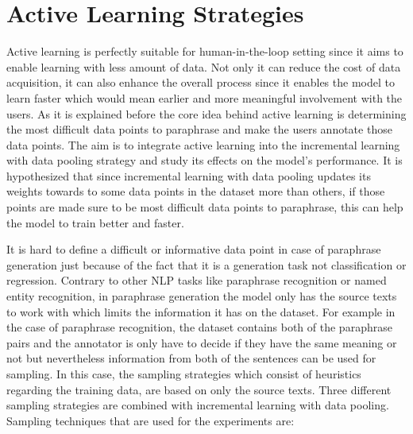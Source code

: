 \section{Active Learning Strategies}

Active learning is perfectly suitable for human-in-the-loop setting since it aims to enable learning with less amount of data. Not only it can reduce the cost of data acquisition, it can also enhance the overall process since it enables the model to learn faster which would mean earlier and more meaningful involvement with the users. As it is explained before the core idea behind active learning is determining the most difficult data points to paraphrase and make the users annotate those data points. The aim is to integrate active learning into the incremental learning with data pooling strategy and study its effects on the model's performance. It is hypothesized that since incremental learning with data pooling updates its weights towards to some data points in the dataset more than others, if those points are made sure to be most difficult data points to paraphrase, this can help the model to train better and faster.

It is hard to define a difficult or informative data point in case of paraphrase generation just because of the fact that it is a generation task not classification or regression. Contrary to other NLP tasks like paraphrase recognition or named entity recognition, in paraphrase generation the model only has the source texts to work with which limits the information it has on the dataset. For example in the case of paraphrase recognition, the dataset contains both of the paraphrase pairs and the annotator is only have to decide if they have the same meaning or not but nevertheless information from both of the sentences can be used for sampling. In this case, the sampling strategies which consist of heuristics regarding the training data, are based on only the source texts. Three different sampling strategies are combined with incremental learning with data pooling. Sampling techniques that are used for the experiments are:

